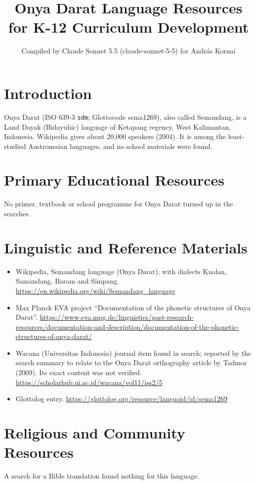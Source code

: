 \documentclass[12pt]{article}
\title{Onya Darat Language Resources for K-12 Curriculum Development}
\author{Compiled by Claude Sonnet 5.5 (claude-sonnet-5-5) for Andr\'as Kornai}
\date{}
\begin{document}
\maketitle

\section{Introduction}
Onya Darat (ISO 639-3 \texttt{sdm}; Glottocode sema1269), also called Semandang, is a Land Dayak (Bidayuhic) language of Ketapang regency, West Kalimantan, Indonesia. Wikipedia gives about 20,000 speakers (2004). It is among the least-studied Austronesian languages, and no school materials were found.

\section{Primary Educational Resources}
No primer, textbook or school programme for Onya Darat turned up in the searches.

\section{Linguistic and Reference Materials}
\begin{itemize}
\item Wikipedia, Semandang language (Onya Darat), with dialects Kualan, Samandang, Baram and Simpang. \url{https://en.wikipedia.org/wiki/Semandang_language}
\item Max Planck EVA project ``Documentation of the phonetic structures of Onya Darat''. \url{https://www.eva.mpg.de/linguistics/past-research-resources/documentation-and-description/documentation-of-the-phonetic-structures-of-onya-darat/}
\item Wacana (Universitas Indonesia) journal item found in search; reported by the search summary to relate to the Onya Darat orthography article by Tadmor (2009). Its exact content was not verified. \url{https://scholarhub.ui.ac.id/wacana/vol11/iss2/5}
\item Glottolog entry. \url{https://glottolog.org/resource/languoid/id/sema1269}
\end{itemize}

\section{Religious and Community Resources}
A search for a Bible translation found nothing for this language.
\end{document}
